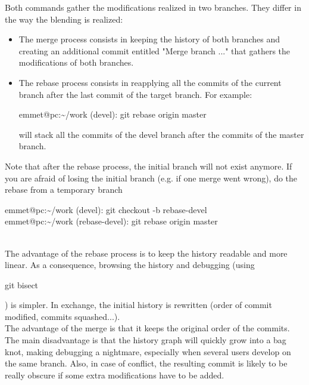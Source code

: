 Both commands gather the modifications realized in two branches.
They differ in the way the blending is realized:
\begin{itemize}
\item The merge process consists in keeping the history of both branches and creating an additional commit entitled "Merge branch ..." that gathers the modifications of both branches.
\item The rebase process consists in reapplying all the commits of the current branch after the last commit of the target branch. 
 For example:\\
\begin{tt}
emmet@pc:\textasciitilde/work (devel): git rebase origin master\\
\end{tt}
will stack all the commits of the devel branch after the commits of the master branch.
\end{itemize}


Note that after the rebase process, the initial branch will not exist anymore.
If you are afraid of losing the initial branch (e.g. if one merge went wrong), do the rebase from a temporary branch\\
\begin{tt}
emmet@pc:\textasciitilde/work (devel): git checkout -b rebase-devel\\
emmet@pc:\textasciitilde/work (rebase-devel): git rebase origin master
\end{tt}\\

The advantage of the rebase process is to keep the history readable and more linear.
As a consequence, browsing the history and debugging (using \begin{tt}git bisect\end{tt}) is simpler.
In exchange, the initial history is rewritten (order of commit modified, commits squashed...).\\

The advantage of the merge is that it keeps the original order of the commits.
The main disadvantage is that the history graph will quickly grow into a bag knot, making debugging a nightmare, especially when several users develop on the same branch.
Also, in case of conflict, the resulting commit is likely to be really obscure if some extra modifications have to be added.\\


